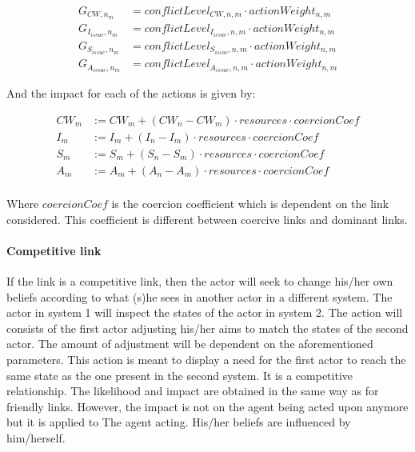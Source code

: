 \begin{equation}\begin{split}
G_{CW, n_m} &= conflictLevel_{CW, n, m} \cdot actionWeight_{n,m} \\
G_{I_{issue}, n_m} &= conflictLevel_{I_{issue}, n, m} \cdot actionWeight_{n,m} \\
G_{S_{issue}, n_m} &= conflictLevel_{S_{issue}, n, m} \cdot actionWeight_{n,m} \\
G_{A_{issue}, n_m} &= conflictLevel_{A_{issue}, n, m} \cdot actionWeight_{n,m}
\end{split}\end{equation}

And the impact for each of the actions is given by:

\begin{equation} \begin{split}
CW_{m} &:= CW_{m} + \left( CW_{n} - CW_{m} \right) \cdot resources \cdot coercionCoef \\
I_{m} &:= I_{m} +  \left(I_{n} - I_{m} \right)  \cdot resources \cdot coercionCoef \\
S_{m} &:= S_{m} + \left(S_{n} - S_{m} \right) \cdot resources \cdot coercionCoef \\
A_{m} &:= A_{m} + \left(A_{n} - A_{m} \right) \cdot resources \cdot coercionCoef \\
\end{split}\end{equation}

Where $coercionCoef$ is the coercion coefficient which is dependent on the link considered. This coefficient is different between coercive links and dominant links.

\paragraph{Competitive link}

If the link is a competitive link, then the actor will seek to change his/her own beliefs according to what (s)he sees in another actor in a different system. The actor in system 1 will inspect the states of the actor in system 2. The action will consists of the first actor adjusting his/her aims to match the states of the second actor. The amount of adjustment will be dependent on the aforementioned parameters. This action is meant to display a need for the first actor to reach the same state as the one present in the second system. It is a competitive relationship. The likelihood and impact are obtained in the same way as for friendly links. However, the impact is not on the agent being acted upon anymore but it is applied to The agent acting. His/her beliefs are influenced by him/herself. \\


